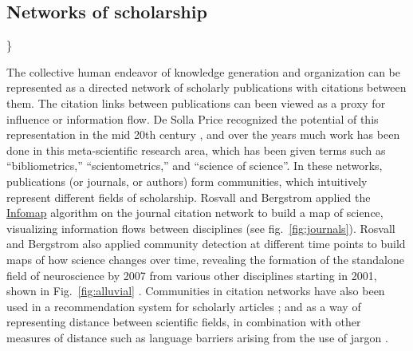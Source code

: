 \hypertarget{networks-of-scholarship}{\subsection{Networks of
scholarship}\label{networks-of-scholarship}}

\protect\hyperlink{networks-of-scholarship}{}\}

The collective human endeavor of knowledge generation and organization
can be represented as a directed network of scholarly publications with
citations between them. The citation links between publications can been
viewed as a proxy for influence or information flow. De Solla Price
recognized the potential of this representation in the mid 20th century
\autocite{de_solla_price_networks_1965}, and over the years much work
has been done in this meta-scientific research area, which has been
given terms such as ``bibliometrics,'' ``scientometrics,'' and ``science
of science''. In these networks, publications (or journals, or authors)
form communities, which intuitively represent different fields of
scholarship. Rosvall and Bergstrom \autocite{rosvall_maps_2008} applied
the \protect\hyperlink{the-dynamical-perspective}{Infomap} algorithm on
the journal citation network to build a map of science, visualizing
information flows between disciplines (see fig.~\ref{fig:journals}).
Rosvall and Bergstrom also applied community detection at different time
points to build maps of how science changes over time, revealing the
formation of the standalone field of neuroscience by 2007 from various
other disciplines starting in 2001, shown in Fig.~\ref{fig:alluvial}
\autocite{rosvall_mapping_2010}. Communities in citation networks have
also been used in a recommendation system for scholarly articles
\autocite{west_recommendation_2016}; and as a way of representing
distance between scientific fields, in combination with other measures
of distance such as language barriers arising from the use of jargon
\autocite{vilhena_finding_2014}.

